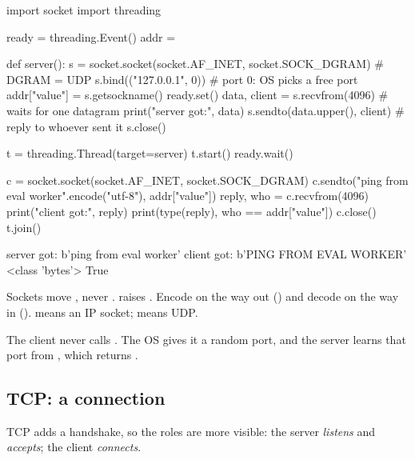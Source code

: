 \begin{pycode}
import socket
import threading

ready = threading.Event()
addr = {}

def server():
    s = socket.socket(socket.AF_INET, socket.SOCK_DGRAM)   # DGRAM = UDP
    s.bind(("127.0.0.1", 0))          # port 0: OS picks a free port
    addr["value"] = s.getsockname()
    ready.set()
    data, client = s.recvfrom(4096)   # waits for one datagram
    print("server got:", data)
    s.sendto(data.upper(), client)    # reply to whoever sent it
    s.close()

t = threading.Thread(target=server)
t.start()
ready.wait()

c = socket.socket(socket.AF_INET, socket.SOCK_DGRAM)
c.sendto("ping from eval worker".encode("utf-8"), addr["value"])
reply, who = c.recvfrom(4096)
print("client got:", reply)
print(type(reply), who == addr["value"])
c.close()
t.join()
\end{pycode}
\begin{rawcode}
server got: b'ping from eval worker'
client got: b'PING FROM EVAL WORKER'
<class 'bytes'> True
\end{rawcode}

\begin{typecheck}
Sockets move , never .  raises
. Encode on the way out () and decode on the way
in ().  means an IP socket;  means
UDP.
\end{typecheck}

The client never calls . The OS gives it a random port, and the server learns
that port from , which returns .

\subsection{TCP: a connection}

TCP adds a handshake, so the roles are more visible: the server \emph{listens} and
\emph{accepts}; the client \emph{connects}.

